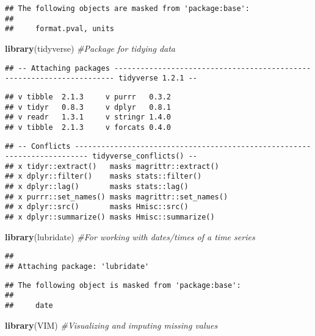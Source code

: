 \documentclass[]{article}
\newenvironment{Shaded}{\begin{snugshade}}{\end{snugshade}}
\newcommand{\CommentTok}[1]{\textcolor[rgb]{0.56,0.35,0.01}{\textit{#1}}}
\newcommand{\KeywordTok}[1]{\textcolor[rgb]{0.13,0.29,0.53}{\textbf{#1}}}
\newcommand{\NormalTok}[1]{#1}
\begin{document}
\begin{verbatim}
## The following objects are masked from 'package:base':
## 
##     format.pval, units
\end{verbatim}

\begin{Shaded}
\begin{Highlighting}[]
\KeywordTok{library}\NormalTok{(tidyverse)  }\CommentTok{#Package for tidying data}
\end{Highlighting}
\end{Shaded}

\begin{verbatim}
## -- Attaching packages ---------------------------------------------------------------------- tidyverse 1.2.1 --
\end{verbatim}

\begin{verbatim}
## v tibble  2.1.3     v purrr   0.3.2
## v tidyr   0.8.3     v dplyr   0.8.1
## v readr   1.3.1     v stringr 1.4.0
## v tibble  2.1.3     v forcats 0.4.0
\end{verbatim}

\begin{verbatim}
## -- Conflicts ------------------------------------------------------------------------- tidyverse_conflicts() --
## x tidyr::extract()   masks magrittr::extract()
## x dplyr::filter()    masks stats::filter()
## x dplyr::lag()       masks stats::lag()
## x purrr::set_names() masks magrittr::set_names()
## x dplyr::src()       masks Hmisc::src()
## x dplyr::summarize() masks Hmisc::summarize()
\end{verbatim}

\begin{Shaded}
\begin{Highlighting}[]
\KeywordTok{library}\NormalTok{(lubridate)  }\CommentTok{#For working with dates/times of a time series}
\end{Highlighting}
\end{Shaded}

\begin{verbatim}
## 
## Attaching package: 'lubridate'
\end{verbatim}

\begin{verbatim}
## The following object is masked from 'package:base':
## 
##     date
\end{verbatim}

\begin{Shaded}
\begin{Highlighting}[]
\KeywordTok{library}\NormalTok{(VIM)        }\CommentTok{#Visualizing and imputing missing values}
\end{Highlighting}
\end{Shaded}
\end{document}
